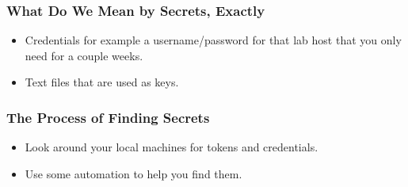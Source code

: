 \documentclass[aspectratio=169]{beamer}
\begin{document}
{
\begin{frame}
	\frametitle{What Do We Mean by Secrets, Exactly}
	\begin{itemize}
		\item Credentials for example a username/password for that lab host that you only need for a couple weeks.
		\item Text files that are used as keys.
	\end{itemize}


\end{frame}
}

{
\begin{frame}
	\frametitle{The Process of Finding Secrets}
	\begin{itemize}
		\item Look around your local machines for tokens and credentials.
		\item Use some automation to help you find them.
	\end{itemize}
\end{frame}
}
\end{document}
